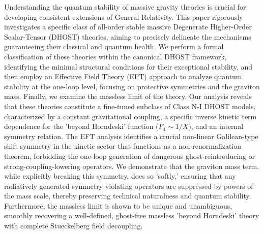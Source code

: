 \documentclass[twocolumn]{aastex631}
\begin{document}
Understanding the quantum stability of massive gravity theories is crucial for developing consistent extensions of General Relativity. This paper rigorously investigates a specific class of all-order stable massive Degenerate Higher-Order Scalar-Tensor (DHOST) theories, aiming to precisely delineate the mechanisms guaranteeing their classical and quantum health. We perform a formal classification of these theories within the canonical DHOST framework, identifying the minimal structural conditions for their exceptional stability, and then employ an Effective Field Theory (EFT) approach to analyze quantum stability at the one-loop level, focusing on protective symmetries and the graviton mass. Finally, we examine the massless limit of the theory. Our analysis reveals that these theories constitute a fine-tuned subclass of Class N-I DHOST models, characterized by a constant gravitational coupling, a specific inverse kinetic term dependence for the 'beyond Horndeski' function ($F_4 \sim 1/X$), and an internal symmetry relation. The EFT analysis identifies a crucial non-linear Galilean-type shift symmetry in the kinetic sector that functions as a non-renormalization theorem, forbidding the one-loop generation of dangerous ghost-reintroducing or strong-coupling-lowering operators. We demonstrate that the graviton mass term, while explicitly breaking this symmetry, does so 'softly,' ensuring that any radiatively generated symmetry-violating operators are suppressed by powers of the mass scale, thereby preserving technical naturalness and quantum stability. Furthermore, the massless limit is shown to be unique and unambiguous, smoothly recovering a well-defined, ghost-free massless 'beyond Horndeski' theory with complete Stueckelberg field decoupling.
\end{document}
